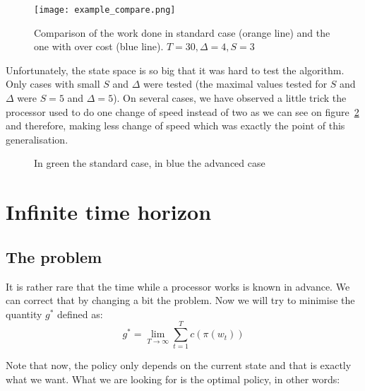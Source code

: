 \documentclass[
10pt, %
a4paper, %
oneside, %
headinclude,footinclude, %
BCOR5mm, %
]{scrartcl}
\begin{document}
\begin{figure}
  \centering
  \texttt{[image: example\_compare.png]}
  \caption{Comparison of the work done in standard case (orange line) and the one
    with over cost (blue line). $T=30,\Delta=4,S=3$}
  \label{fig:algo_overcost}
\end{figure}

Unfortunately, the state space is so big that it was hard to test the
algorithm. Only cases with small $S$ and $\Delta$ were tested
(the maximal values tested for $S$ and $\Delta$ were $S=5$ and
$\Delta=5$). On
several cases, we have observed a little trick the processor used to do
one change of speed instead of two as we can see on
figure~\ref{fig:eco} and therefore, making less change of speed which
was exactly the point of this generalisation.

\begin{figure}
  \centering
  \caption{In green the standard case, in blue the advanced case}
  \label{fig:eco}
\end{figure}


\section{Infinite time horizon}

\subsection{The problem}

It is rather rare that the time while a processor works is known in
advance. We can correct that by changing a bit the problem. Now we will try
to minimise the quantity $g^*$ defined as:\\
\begin{equation}
  \label{eq:inftyth}
  g^* = \lim\limits_{T\rightarrow\infty}\sum\limits_{t=1}^Tc(\pi(w_t))
\end{equation}

Note that now, the policy only depends on the current state and that
is exactly what we want. What we are looking for is the optimal
policy, in other words:\\
\end{document}

